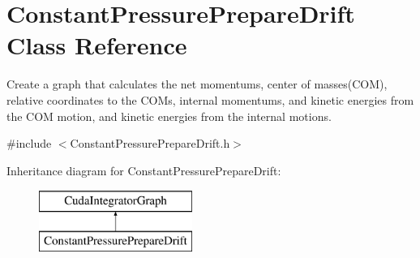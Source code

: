 \hypertarget{classConstantPressurePrepareDrift}{}\section{Constant\+Pressure\+Prepare\+Drift Class Reference}
\label{classConstantPressurePrepareDrift}


Create a graph that calculates the net momentums, center of masses(\+C\+O\+M), relative coordinates to the C\+O\+Ms, internal momentums, and kinetic energies from the C\+OM motion, and kinetic energies from the internal motions.  




{\ttfamily \#include $<$Constant\+Pressure\+Prepare\+Drift.\+h$>$}

Inheritance diagram for Constant\+Pressure\+Prepare\+Drift\+:\begin{figure}[H]
\begin{center}
\leavevmode
\includegraphics[height=2.000000cm]{classConstantPressurePrepareDrift}
\end{center}
\end{figure}
